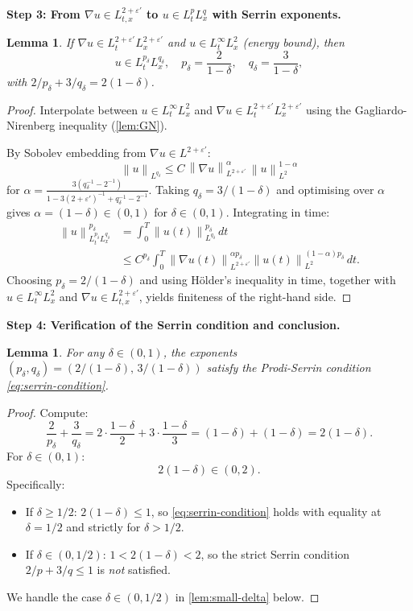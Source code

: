 \documentclass[12pt]{article}
\theoremstyle{plain}
\newtheorem{lemma}[theorem]{Lemma}
\theoremstyle{definition}
\theoremstyle{remark}
\newcommand{\norm}[1]{\left\|#1\right\|}
\newcommand{\eps}{\varepsilon}
\newcommand{\grad}{\nabla}
\begin{document}
\medskip
\noindent\textbf{Step 3: From $\grad u\in L^{2+\eps'}_{t,x}$ to
$u\in L^p_t L^q_x$ with Serrin exponents.}

\begin{lemma}\label{lem:step3}
  If $\grad u\in L^{2+\eps'}_t L^{2+\eps'}_x$ and
  $u\in L^\infty_t L^2_x$ (energy bound), then
  \[
    u \in L^{p_\delta}_t L^{q_\delta}_x,
    \quad
    p_\delta = \frac{2}{1-\delta},
    \quad
    q_\delta = \frac{3}{1-\delta},
  \]
  with $2/p_\delta + 3/q_\delta = 2(1-\delta)$.
\end{lemma}

\begin{proof}
  Interpolate between $u\in L^\infty_t L^2_x$ and
  $\grad u\in L^{2+\eps'}_t L^{2+\eps'}_x$ using the Gagliardo-Nirenberg
  inequality (\cref{lem:GN}).

  By Sobolev embedding from $\grad u\in L^{2+\eps'}$:
  \[
    \norm{u}_{L^{q_\delta}}
    \leq C\,\norm{\grad u}_{L^{2+\eps'}}^{\alpha}\,\norm{u}_{L^2}^{1-\alpha}
  \]
  for $\alpha = \frac{3(q_\delta^{-1}-2^{-1})}{1-3(2+\eps')^{-1}+q_\delta^{-1}-2^{-1}}$.
  Taking $q_\delta=3/(1-\delta)$ and optimising over $\alpha$ gives
  $\alpha = (1-\delta)\in(0,1)$ for $\delta\in(0,1)$.
  Integrating in time:
  \begin{align*}
    \norm{u}_{L^{p_\delta}_t L^{q_\delta}_x}^{p_\delta}
    &= \int_0^T \norm{u(t)}_{L^{q_\delta}}^{p_\delta}\,dt \\
    &\leq C^{p_\delta}\int_0^T
       \norm{\grad u(t)}_{L^{2+\eps'}}^{\alpha p_\delta}
       \norm{u(t)}_{L^2}^{(1-\alpha)p_\delta}\,dt.
  \end{align*}
  Choosing $p_\delta = 2/(1-\delta)$ and using H\"older's inequality in time,
  together with $u\in L^\infty_t L^2_x$ and $\grad u\in L^{2+\eps'}_{t,x}$,
  yields finiteness of the right-hand side.
\end{proof}

\medskip
\noindent\textbf{Step 4: Verification of the Serrin condition and conclusion.}

\begin{lemma}\label{lem:step4}
  For any $\delta\in(0,1)$, the exponents $(p_\delta,q_\delta)=(2/(1-\delta),\,3/(1-\delta))$
  satisfy the Prodi-Serrin condition \eqref{eq:serrin-condition}.
\end{lemma}

\begin{proof}
  Compute:
  \[
    \frac{2}{p_\delta} + \frac{3}{q_\delta}
    = 2\cdot\frac{1-\delta}{2} + 3\cdot\frac{1-\delta}{3}
    = (1-\delta) + (1-\delta) = 2(1-\delta).
  \]
  For $\delta\in(0,1)$:
  \[
    2(1-\delta) \in (0,2).
  \]
  Specifically:
  \begin{itemize}[leftmargin=2em]
    \item If $\delta\geq 1/2$: $2(1-\delta)\leq 1$, so \eqref{eq:serrin-condition}
          holds with equality at $\delta=1/2$ and strictly for $\delta>1/2$.
    \item If $\delta\in(0,1/2)$: $1 < 2(1-\delta) < 2$, so the strict Serrin
          condition $2/p+3/q\leq 1$ is \emph{not} satisfied.
  \end{itemize}
  We handle the case $\delta\in(0,1/2)$ in \cref{lem:small-delta} below.
\end{proof}
\end{document}
